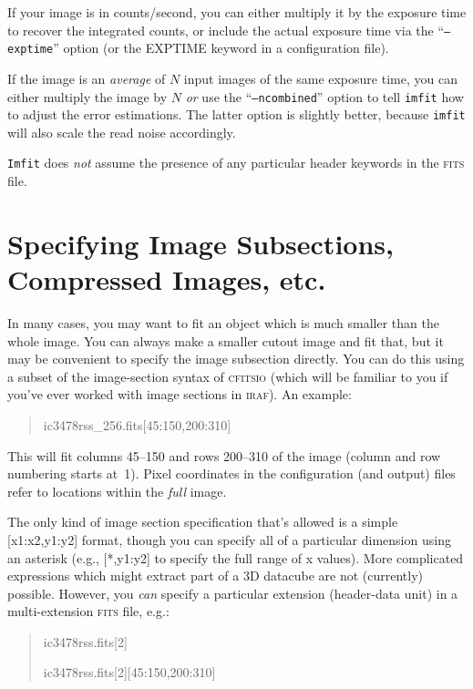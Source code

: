 \documentclass[10pt,a4paper,article]{memoir}
\newcommand{\imfit}{\texttt{imfit}}
\newcommand{\Imfit}{\texttt{Imfit}}
\begin{document}
If your image is in counts/second, you can either multiply it by the
exposure time to recover the integrated counts, or include the actual
exposure time via the ``\texttt{--exptime}'' option (or the EXPTIME keyword
in a configuration file).

If the image is an \textit{average} of $N$ input images of the same exposure time, you
can either multiply the image by $N$ \textit{or} use the ``\texttt{--ncombined}'' option
to tell \imfit{} how to adjust the error estimations.  The latter option is slightly
better, because \imfit{} will also scale the read noise accordingly.

\Imfit{} does \textit{not} assume the presence of any particular header
keywords in the \textsc{fits} file.




\section{Specifying Image Subsections, Compressed Images, etc.}

In many cases, you may want to fit an object which is much smaller than the whole
image. You can always make a smaller cutout image and fit that, but it may be convenient to
specify the image subsection directly. You can do this using a subset of the image-section
syntax of \textsc{cfitsio} (which will be familiar to you if you've ever worked with
image sections in \textsc{iraf}). An example:

\begin{quote}
ic3478rss\_256.fits[45:150,200:310]
\end{quote}
This will fit columns 45--150 and rows 200--310 of the image (column and row
numbering starts at~1). Pixel coordinates in the configuration (and output)
files refer to locations within the \textit{full} image.

The only kind of image section specification that's allowed is a simple
[x1:x2,y1:y2] format, though you can specify all of a particular dimension using
an asterisk (e.g., [*,y1:y2] to specify the full range of x values). More
complicated expressions which might extract part of a 3D datacube are not
(currently) possible. However, you \textit{can} specify a particular extension
(header-data unit) in a multi-extension \textsc{fits} file, e.g.:

\begin{quote}
ic3478rss.fits[2]

ic3478rss.fits[2][45:150,200:310]
\end{quote}
\end{document}
